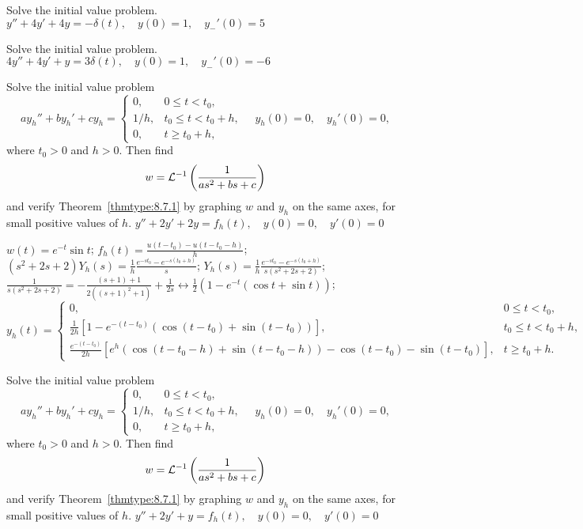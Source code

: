 \documentclass{ximera}
\begin{document}
\begin{problem}\label{exer:8.7.24}
Solve the initial value
problem.
$y''+4y'+4y=-\delta(t), \quad  y(0)=1,\quad y_-'(0)=5$
\end{problem}

\begin{problem}\label{exer:8.7.25}
Solve the initial value
problem.
$4y''+4y'+y=3\delta(t), \quad  y(0)=1,\quad y_-'(0)=-6$
\end{problem}

\begin{problem}\label{exer:8.7.26} Solve the initial value problem
$$
ay_h''+by_h'+cy_h=
\left\{\begin{array}{cl} 0,&0\le t<t_0,\\
1/h,&t_0\le t< t_0+h,\\
0,&t\ge t_0+h,\end{array}\right.
\quad y_h(0)=0,\quad y_h'(0)=0,
$$
where $t_0>0$ and $h>0$. Then find
$$
w={\cal L}^{-1}\left(\frac{1}{as^2+bs+c}\right)
$$
and verify Theorem~\ref{thmtype:8.7.1} by graphing $w$ and $y_h$
on the same axes, for small positive values of $h$.
$y''+2y'+2y=f_h(t), \quad  y(0)=0,\quad y'(0)=0$

\begin{solution}
$w(t)=e^{-t}\sin t$;
$f_h(t)=\frac{u(t-t_0)-u(t-t_0-h)}{h}$;
$(s^2+2s+2)Y_h(s)=\frac{1}{h}\frac{e^{-st_0}-e^{-s(t_0+h)}}{s}$;
$Y_h(s)=\frac{1}{h}\frac{e^{-st_0}-e^{-s(t_0+h)}}{s(s^2+2s+2)}$;
$\frac{1}{s(s^2+2s+2)}=-\frac{(s+1)+1}{2\left((s+1)^2+1\right)}
+\frac{1}{2s}\leftrightarrow
\frac{1}{2}\left(1-e^{-t}(\cos t+\sin t)\right)$;
$$
y_h(t)=
\left\{\begin{array}{cl} 0,&0\le t<t_0,\\ 
\frac{1}{2h}\left[1-e^{-(t-t_0)}(\cos(t-t_0)+\sin(t-t_0))\right],
&t_0\le t< t_0+h,\\ 
\frac{e^{-(t-t_0)}}{2h}\left[e^h\left(\cos(t-t_0-h)+\sin(t-t_0-h)\right)
-\cos(t-t_0)-\sin(t-t_0)\right] ,&t\ge t_0+h.\end{array}\right.
$$
\end{solution}
\end{problem}

\begin{problem}\label{exer:8.7.27} Solve the initial value problem
$$
ay_h''+by_h'+cy_h=
\left\{\begin{array}{cl} 0,&0\le t<t_0,\\
1/h,&t_0\le t< t_0+h,\\
0,&t\ge t_0+h,\end{array}\right.
\quad y_h(0)=0,\quad y_h'(0)=0,
$$
where $t_0>0$ and $h>0$. Then find
$$
w={\cal L}^{-1}\left(\frac{1}{as^2+bs+c}\right)
$$
and verify Theorem~\ref{thmtype:8.7.1} by graphing $w$ and $y_h$
on the same axes, for small positive values of $h$.
$y''+2y'+y=f_h(t), \quad  y(0)=0,\quad y'(0)=0$
\end{problem}
\end{document}
